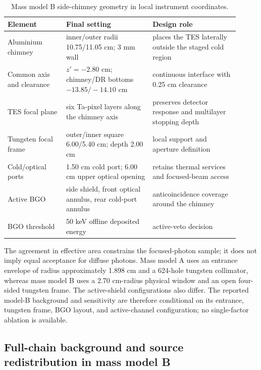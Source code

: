 \documentclass[11pt]{article}
\begin{document}
\begin{table}[!ht]
\centering
\caption{Mass model B side-chimney geometry in local instrument coordinates.}
\label{tab:final_geometry}
\footnotesize
\begin{tabular}{p{0.23\linewidth}p{0.34\linewidth}p{0.34\linewidth}}
\toprule
Element & Final setting & Design role \\
\midrule
Aluminium chimney & inner/outer radii 10.75/11.05 cm; 3 mm wall & places the TES laterally outside the staged cold region \\
Common axis and clearance & $z'=-2.80$ cm; chimney/DR bottoms $-13.85/-14.10$ cm & continuous interface with 0.25 cm clearance \\
TES focal plane & six Ta-pixel layers along the chimney axis & preserves detector response and multilayer stopping depth \\
Tungsten focal frame & outer/inner square 6.00/5.40 cm; depth 2.00 cm & local support and aperture definition \\
Cold/optical ports & 1.50 cm cold port; 6.00 cm upper optical opening & retains thermal services and focused-beam access \\
Active BGO & side shield, front optical annulus, rear cold-port annulus & anticoincidence coverage around the chimney \\
BGO threshold & 50 keV offline deposited energy & active-veto decision \\
\bottomrule
\end{tabular}
\end{table}

The agreement in effective area constrains the focused-photon sample; it does not imply equal acceptance for diffuse photons. Mass model A uses an entrance envelope of radius approximately 1.898 cm and a 624-hole tungsten collimator, whereas mass model B uses a 2.70 cm-radius physical window and an open four-sided tungsten frame. The active-shield configurations also differ. The reported model-B background and sensitivity are therefore conditional on its entrance, tungsten frame, BGO layout, and active-channel configuration; no single-factor ablation is available.

\FloatBarrier

\subsection{Full-chain background and source redistribution in mass model B}
\label{subsec:optimized_fullchain}
\end{document}
